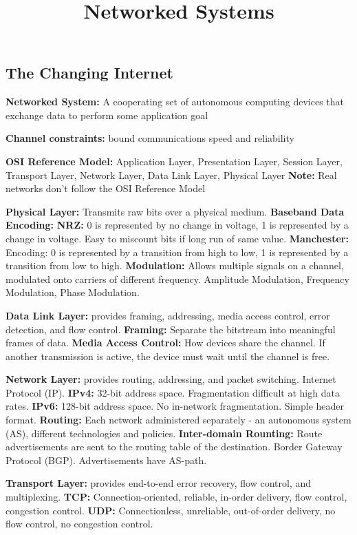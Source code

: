 \documentclass{article}
\title{Networked Systems}
\author{}
\date{}
\begin{document}
\footnotesize

\subsection*{The Changing Internet}

\noindent \textbf{Networked System:} A cooperating set of autonomous computing devices that exchange data to perform some application goal

\noindent \textbf{Channel constraints:} bound communications speed and reliability

\noindent \textbf{OSI Reference Model:} Application Layer, Presentation Layer, Session Layer, Transport Layer, Network Layer, Data Link Layer, Physical Layer
\textbf{Note:} Real networks don't follow the OSI Reference Model

\noindent \textbf{Physical Layer:} Transmits raw bits over a physical medium.
\textbf{Baseband Data Encoding:}
\textbf{NRZ:} 0 is represented by no change in voltage, 1 is represented by a change in voltage. Easy to miscount bits if long run of same value.
\textbf{Manchester:} Encoding: 0 is represented by a transition from high to low, 1 is represented by a transition from low to high.
\textbf{Modulation:} Allows multiple signals on a channel, modulated onto carriers of different frequency. Amplitude Modulation, Frequency Modulation, Phase Modulation.

\noindent \textbf{Data Link Layer:} provides framing, addressing, media access control, error detection, and flow control.
\textbf{Framing:} Separate the bitstream into meaningful frames of data.
\textbf{Media Access Control:} How devices share the channel. If another transmission is active, the device must wait until the channel is free.


\noindent \textbf{Network Layer:} provides routing, addressing, and packet switching. Internet Protocol (IP).
\textbf{IPv4:} 32-bit address space. Fragmentation difficult at high data rates.
\textbf{IPv6:} 128-bit address space. No in-network fragmentation. Simple header format.
\textbf{Routing:} Each network administered separately - an autonomous system (AS), different technologies and policies.
\textbf{Inter-domain Rounting:} Route advertisements are sent to the routing table of the destination. Border Gateway Protocol (BGP). Advertisements have AS-path.


\noindent \textbf{Transport Layer:} provides end-to-end error recovery, flow control, and multiplexing.
\textbf{TCP:} Connection-oriented, reliable, in-order delivery, flow control, congestion control.
\textbf{UDP:} Connectionless, unreliable, out-of-order delivery, no flow control, no congestion control.
\end{document}
